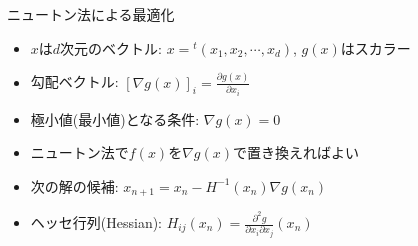\begin{frame}[t,fragile]{ニュートン法による最適化}
  \begin{itemize}
    \setlength{\itemsep}{1em}
  \item $x$は$d$次元のベクトル: $x = {}^t(x_1,x_2,\cdots,x_d)$, $g(x)$はスカラー
  \item 勾配ベクトル: $\displaystyle [\nabla g(x)]_i = \frac{\partial g(x)}{\partial x_i}$
  \item 極小値(最小値)となる条件: $\nabla g(x)=0$
  \item ニュートン法で$f(x)$を$\nabla g(x)$で置き換えればよい
  \item 次の解の候補: $\displaystyle x_{n+1} = x_n - H^{-1}(x_n) \nabla g(x_n)$
  \item ヘッセ行列(Hessian): $\displaystyle H_{ij}(x_n) = \frac{\partial^2 g}{\partial x_i \partial x_j}(x_n)$
  \end{itemize}
\end{frame}
